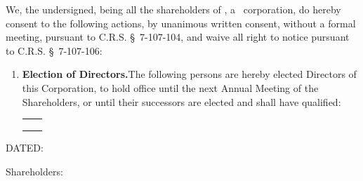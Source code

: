 
\bigskip

We, the undersigned, being all the shareholders of \companyName, a \companyState\ corporation,
do hereby consent to the following actions, by unanimous written consent, without a formal
meeting, pursuant to C.R.S. \S~7-107-104, and waive all right to notice pursuant to
C.R.S. \S~7-107-106:

\begin{enumerate}[leftmargin=*, label=\arabic*.]
	\item \textbf{Election of Directors.}\enspace The following persons are hereby elected
	Directors of this Corporation, to hold office until the next Annual Meeting of the
	Shareholders, or until their successors are elected and shall have qualified:

	\smallskip
	\begin{center}
		\begin{tabular}{@{}p{}p{}@{}}
			\directorOne   & \directorTwo  \\
			\directorThree & \directorFour \\
			\directorFive  & \directorSix  \\
		\end{tabular}
	\end{center}
\end{enumerate}

\bigskip
\noindent DATED: \datedText

\bigskip
\noindent Shareholders:

\sigpair{\directorOne}{\directorTwo}
\sigpair{\directorThree}{\directorFour}
\sigpair{\directorFive}{\directorSix}
